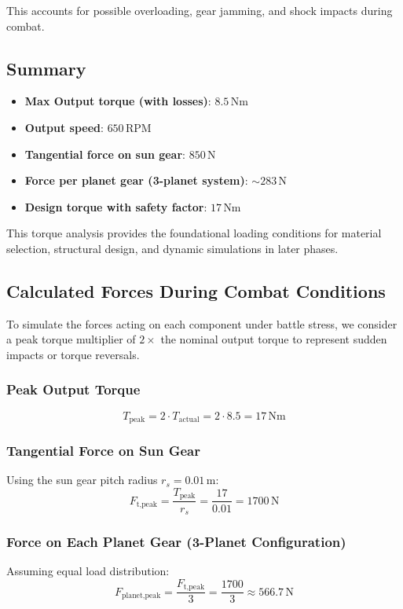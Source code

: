 \documentclass[a4paper,12pt]{article}
\begin{document}
This accounts for possible overloading, gear jamming, and shock impacts during combat.

\subsection*{Summary}
\begin{itemize}
    \item \textbf{Max Output torque (with losses)}: \( 8.5 \, \text{Nm} \)
    \item \textbf{Output speed}: \( 650 \, \text{RPM} \)
    \item \textbf{Tangential force on sun gear}: \( 850 \, \text{N} \)
    \item \textbf{Force per planet gear (3-planet system)}: \( \sim283 \, \text{N} \)
    \item \textbf{Design torque with safety factor}: \( 17 \, \text{Nm} \)
\end{itemize}

This torque analysis provides the foundational loading conditions for material selection, structural design, and dynamic simulations in later phases.

\subsection*{Calculated Forces During Combat Conditions}

To simulate the forces acting on each component under battle stress, we consider a peak torque multiplier of \( 2 \times \) the nominal output torque to represent sudden impacts or torque reversals.

\subsubsection*{Peak Output Torque}
\[
T_{\text{peak}} = 2 \cdot T_{\text{actual}} = 2 \cdot 8.5 = 17 \, \text{Nm}
\]

\subsubsection*{Tangential Force on Sun Gear}
Using the sun gear pitch radius \( r_s = 0.01 \, \text{m} \):
\[
F_{\text{t,peak}} = \frac{T_{\text{peak}}}{r_s} = \frac{17}{0.01} = 1700 \, \text{N}
\]

\subsubsection*{Force on Each Planet Gear (3-Planet Configuration)}
Assuming equal load distribution:
\[
F_{\text{planet,peak}} = \frac{F_{\text{t,peak}}}{3} = \frac{1700}{3} \approx 566.7 \, \text{N}
\]
\end{document}
